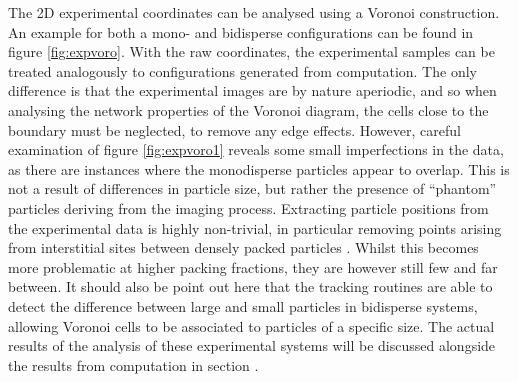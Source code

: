 The 2D experimental coordinates can be analysed using a Voronoi construction. An example for both a mono\-- and bidisperse configurations can be found in figure \ref{fig:expvoro}.
With the raw coordinates, the experimental samples can be treated analogously to configurations generated from computation.
The only difference is that the experimental images are by nature aperiodic, and so when analysing the network properties of the Voronoi diagram, the cells close to the boundary must be neglected, to remove any edge effects. 
However, careful examination of figure \ref{fig:expvoro1} reveals some small imperfections in the data, as there are instances where the monodisperse particles appear to overlap.
This is not a result of differences in particle size, but rather the presence of ``phantom'' particles deriving from the imaging process.
Extracting particle positions from the experimental data is highly non\--trivial, in particular removing points arising from interstitial sites between densely packed particles \cite{alice2015a}.
Whilst this becomes more problematic at higher packing fractions, they are however still few and far between.
It should also be point out here that the tracking routines are able to detect the difference between large and small particles in bidisperse systems, allowing Voronoi cells to be associated to particles of a specific size.
The actual results of the analysis of these experimental systems will be discussed alongside the results from computation in section .

